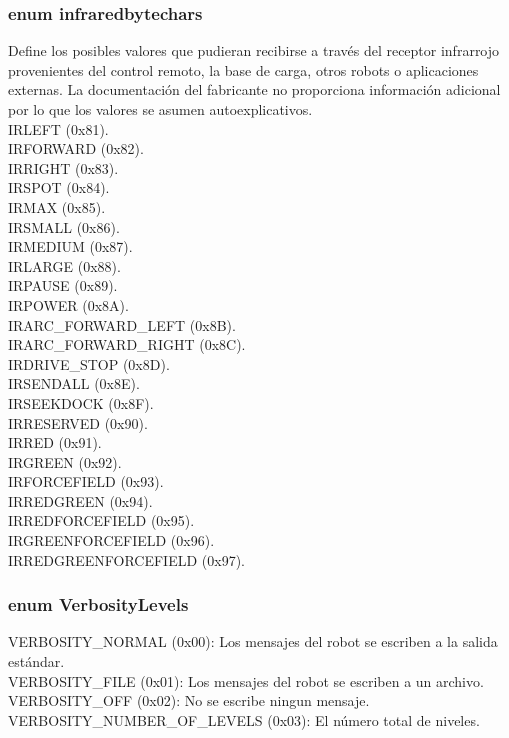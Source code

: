 \documentclass[letterpaper,openright,12pt]{book}
\begin{document}
\subsubsection{enum infraredbytechars}
Define los posibles valores que pudieran recibirse a través del receptor infrarrojo provenientes del control remoto, la base de carga, otros robots o aplicaciones externas. La documentación del fabricante no proporciona información adicional por lo que los valores se asumen autoexplicativos.\\
IRLEFT (0x81).\\
IRFORWARD (0x82).\\
IRRIGHT (0x83).\\
IRSPOT (0x84).\\
IRMAX (0x85).\\
IRSMALL (0x86).\\
IRMEDIUM (0x87).\\
IRLARGE (0x88).\\
IRPAUSE (0x89).\\
IRPOWER (0x8A).\\
IRARC\_FORWARD\_LEFT (0x8B).\\
IRARC\_FORWARD\_RIGHT (0x8C).\\
IRDRIVE\_STOP (0x8D).\\
IRSENDALL (0x8E).\\
IRSEEKDOCK (0x8F).\\
IRRESERVED (0x90).\\
IRRED (0x91).\\
IRGREEN (0x92).\\
IRFORCEFIELD (0x93).\\
IRREDGREEN (0x94).\\
IRREDFORCEFIELD (0x95).\\
IRGREENFORCEFIELD (0x96).\\
IRREDGREENFORCEFIELD (0x97).\\

\subsubsection{ enum VerbosityLevels}
VERBOSITY\_NORMAL (0x00): Los mensajes del robot se escriben a la salida estándar.\\
VERBOSITY\_FILE (0x01): Los mensajes del robot se escriben a un archivo.\\
VERBOSITY\_OFF (0x02): No se escribe ningun mensaje.\\
VERBOSITY\_NUMBER\_OF\_LEVELS (0x03): El número total de niveles.\\
\end{document}
